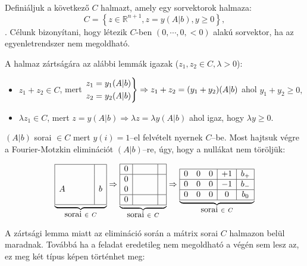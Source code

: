 Definiáljuk a következő $C$ halmazt, amely egy sorvektorok halmaza:
\[ C= \left\{ z \in \mathbb{R}^{n+1}, z = y (A|b), y \geq 0 \right\}, \].
Célunk bizonyítani, hogy létezik $C$-ben $(0, \cdots, 0 , <0)$ alakú sorvektor,
ha az egyenletrendszer nem megoldható.

A halmaz zártságára az alábbi lemmák igazak ($z_1, z_2 \in C, \lambda>0$):

\begin{itemize}
  \item $z_1+z_2 \in C$, mert $\begin{rcases}
  z_1=y_1(A|b) \\
  z_2=y_2(A|b) \end{rcases} \Rightarrow z_1+z_2=(y_1+y_2)(A|b)$ ahol $y_1+y_2 \geq 0,$
  \item $\lambda z_1 \in C$, mert $
  z=y(A|b) \Rightarrow \lambda z = \lambda y (A|b)$ ahol igaz, hogy $\lambda y \geq 0$.
\end{itemize}

$(A|b)$ sorai $\in C$ mert $y(i)=1$--el felvételt nyernek $C$--be. Most hajtsuk végre a
Fourier-Motzkin eliminációt $(A|b)$--re, úgy, hogy a nullákat nem töröljük:

\begin{displaymath}
\underbrace{
\begin{array}{|cccc|c|}
\hline
 &  &  &  & \\
 &  & &  & \\
A &  & &  &b \\
 &  & & &\\
\hline
\end{array}}_{\mbox{sorai } \in~C}
\Rightarrow
\underbrace{
\begin{array}{|c|ccc|c|}
\hline
0 &  &  &  & \\
\hline
0 &  & &  & \\
0 &  & &  & \\
\hline
0 &  & & &\\
\hline
\end{array}}_{\mbox{sorai } \in~C}
\Rightarrow
\underbrace{
\begin{array}{|ccc|c|c|}
\hline
0 &  0 &0  & +1  & b_+\\
\hline
0 &  0& 0&  -1& b_-\\
\hline
0 &  0& 0& 0& b_0\\
\hline
\end{array}}_{\mbox{sorai } \in~C}
\end{displaymath}

A zártsági lemma miatt az elimináció során a mátrix sorai $C$ halmazon belül
maradnak. Továbbá ha a feladat eredetileg nem megoldható a végén sem lesz az, ez 
meg két típus képen történhet meg:

